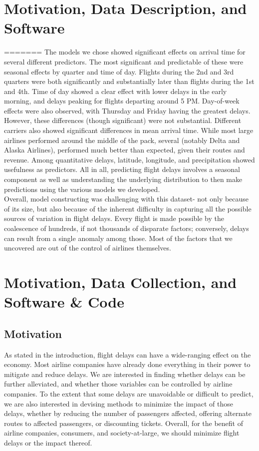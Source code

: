 \documentclass[12pt, a4paper, openany]{book}
\newcommand\tab[1][1cm]{\hspace*{#1}}
\begin{document}
\chapter{Motivation, Data Description, and Software}
=======
\tab The models we chose showed significant effects on arrival time for several different predictors. The most significant and predictable of these were seasonal effects by quarter and time of day. Flights during the 2nd and 3rd quarters were both significantly and substantially later than flights during the 1st and 4th. Time of day showed a clear effect with lower delays in the early morning, and delays peaking for flights departing around 5 PM. Day-of-week effects were also observed, with Thursday and Friday having the greatest delays. However, these differences (though significant) were not substantial. Different carriers also showed significant differences in mean arrival time. While most large airlines performed around the middle of the pack, several (notably Delta and Alaska Airlines), performed much better than expected, given their routes and revenue. Among quantitative delays, latitude, longitude, and precipitation showed usefulness as predictors. All in all, predicting flight delays involves a seasonal component as well as understanding the underlying distribution to then make predictions using the various models we developed.\\
\tab Overall, model constructing was challenging with this dataset- not only because of its size, but also because of the inherent difficulty in capturing all the possible sources of variation in flight delays. Every flight is made possible by the coalescence of hundreds, if not thousands of disparate factors; conversely, delays can result from a single anomaly among those. Most of the factors that we uncovered are out of the control of airlines themselves. 
\chapter{Motivation, Data Collection, and Software \& Code}

	\section{Motivation}
	\tab As stated in the introduction, flight delays can have a wide-ranging effect on the economy. Most airline companies have already done everything in their power to mitigate and reduce delays. We are interested in finding whether delays can be further alleviated, and whether those variables can be controlled by airline companies. To the extent that some delays are unavoidable or difficult to predict, we are also interested in devising methods to minimize the impact of those delays, whether by reducing the number of passengers affected, offering alternate routes to affected passengers, or discounting tickets. Overall, for the benefit of airline companies, consumers, and society-at-large, we should minimize flight delays or the impact thereof. 
\end{document}
